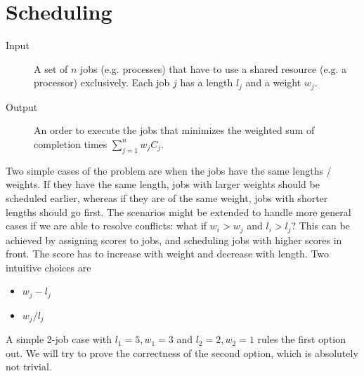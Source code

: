 \section{Scheduling}
\begin{description}
\item[Input]A set of $n$ jobs (e.g. processes) that have to use a shared resource (e.g. a processor) exclusively. Each job $j$ has a length $l_j$ and a weight $w_j$. 
\item[Output]An order to execute the jobs that minimizes the weighted sum of completion times $\sum\limits_{j=1}^{n}w_jC_j.$
\end{description}
Two simple cases of the problem are when the jobs have the same lengths / weights. If they have the same length, jobs with larger weights should be scheduled earlier, whereas if they are of the same weight, jobs with shorter lengths should go first. The scenarios might be extended to handle more general cases if we are able to resolve conflicts: what if $w_i>w_j$ and $l_i>l_j$? This can be achieved by assigning scores to jobs, and scheduling jobs with higher scores in front. The score has to increase with weight and decrease with length. Two intuitive choices are 
\begin{itemize}
\item $w_j-l_j$
\item $w_j/l_j$
\end{itemize}
A simple 2-job case with $l_1=5,\allowbreak w_1=3$ and $l_2=2,\allowbreak w_2=1$ rules the first option out. We will try to prove the correctness of the second option, which is absolutely not trivial.


\ifx\PREAMBLE\undefined

\fi